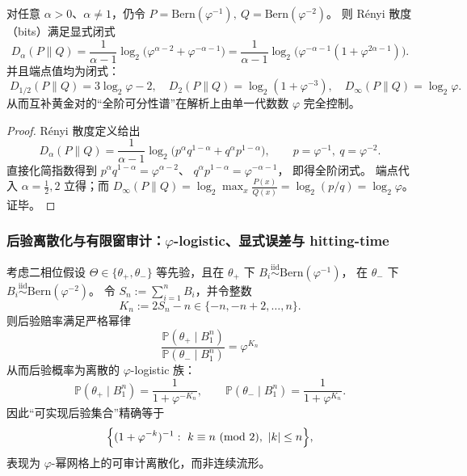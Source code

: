 \begin{proposition}\label{prop:pom-complementary-golden-bernoulli-renyi-spectrum}
对任意 \(\alpha>0\)、\(\alpha\neq 1\)，仍令
\(
P=\mathrm{Bern}(\varphi^{-1}),\ Q=\mathrm{Bern}(\varphi^{-2})
\)。
则 Rényi 散度（bits）满足显式闭式
\[
\boxed{\;
D_\alpha(P\|Q)
=\frac{1}{\alpha-1}\log_2\!\Big(\varphi^{\alpha-2}+\varphi^{-\alpha-1}\Big)
=\frac{1}{\alpha-1}\log_2\!\Big(\varphi^{-\alpha-1}(1+\varphi^{2\alpha-1})\Big).\;}
\]
并且端点值均为闭式：
\[
\boxed{\;
D_{1/2}(P\|Q)=3\log_2\varphi-2,\quad
D_{2}(P\|Q)=\log_2(1+\varphi^{-3}),\quad
D_{\infty}(P\|Q)=\log_2\varphi.\;}
\]
从而互补黄金对的“全阶可分性谱”在解析上由单一代数数 \(\varphi\) 完全控制。
\end{proposition}

\begin{proof}
Rényi 散度定义给出
\[
D_\alpha(P\|Q)=\frac{1}{\alpha-1}\log_2\!\Big(p^\alpha q^{1-\alpha}+q^\alpha p^{1-\alpha}\Big),
\qquad p=\varphi^{-1},\ q=\varphi^{-2}.
\]
直接化简指数得到
\(
p^\alpha q^{1-\alpha}=\varphi^{\alpha-2}
\)、
\(
q^\alpha p^{1-\alpha}=\varphi^{-\alpha-1}
\)，
即得全阶闭式。
端点代入 \(\alpha=\tfrac12,2\) 立得；而 \(D_\infty(P\|Q)=\log_2\max_x \frac{P(x)}{Q(x)}=\log_2(p/q)=\log_2\varphi\)。证毕。
\end{proof}

\subsubsection{后验离散化与有限窗审计：\texorpdfstring{$\varphi$}{phi}-logistic、显式误差与 hitting-time}

\begin{proposition}\label{prop:pom-phi-logistic-posterior-grid}
考虑二相位假设 \(\Theta\in\{\theta_+,\theta_-\}\) 等先验，且在 \(\theta_+\) 下
\(
B_i\stackrel{\mathrm{iid}}{\sim}\mathrm{Bern}(\varphi^{-1})
\)，
在 \(\theta_-\) 下
\(
B_i\stackrel{\mathrm{iid}}{\sim}\mathrm{Bern}(\varphi^{-2})
\)。
令 \(S_n:=\sum_{i=1}^{n}B_i\)，并令整数
\[
K_n:=2S_n-n\in\{-n,-n+2,\dots,n\}.
\]
则后验赔率满足严格幂律
\[
\boxed{\;
\frac{\mathbb{P}(\theta_+\mid B_1^n)}{\mathbb{P}(\theta_-\mid B_1^n)}=\varphi^{K_n}\;}
\]
从而后验概率为离散的 \(\varphi\)-logistic 族：
\[
\boxed{\;
\mathbb{P}(\theta_+\mid B_1^n)=\frac{1}{1+\varphi^{-K_n}},\qquad
\mathbb{P}(\theta_-\mid B_1^n)=\frac{1}{1+\varphi^{K_n}}.\;}
\]
因此“可实现后验集合”精确等于
\[
\Bigl\{(1+\varphi^{-k})^{-1}:\ k\equiv n\ (\mathrm{mod}\ 2),\ |k|\le n\Bigr\},
\]
表现为 \(\varphi\)-幂网格上的可审计离散化，而非连续流形。
\end{proposition}

